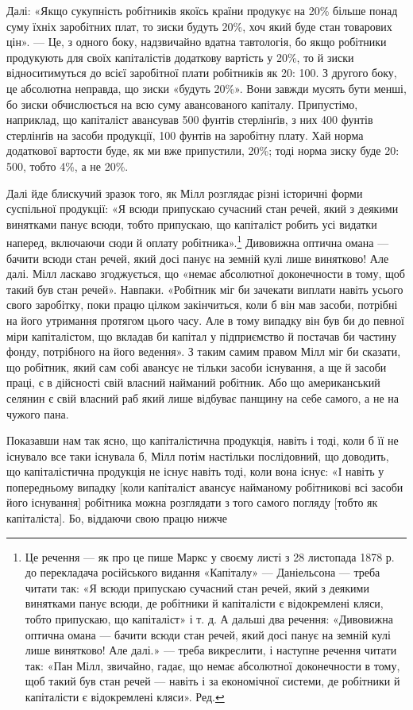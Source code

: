 Далі: «Якщо сукупність робітників якоїсь країни продукує
на 20\% більше понад суму їхніх заробітних плат, то зиски будуть
20\%, хоч який буде стан товарових цін». — Це, з одного
боку, надзвичайно вдатна тавтологія, бо якщо робітники продукують
для своїх капіталістів додаткову вартість у 20\%, то й зиски
відноситимуться до всієї заробітної плати робітників як 20: 100.
З другого боку, це абсолютна неправда, що зиски «будуть 20\%».
Вони завжди мусять бути менші, бо зиски обчислюється на всю
суму авансованого капіталу. Припустімо, наприклад, що капіталіст
авансував 500 фунтів стерлінґів, з них 400 фунтів стерлінґів
на засоби продукції, 100 фунтів на заробітну плату. Хай
норма додаткової вартости буде, як ми вже припустили, 20\%;
тоді норма зиску буде 20: 500, тобто 4\%, а не 20\%.

Далі йде блискучий зразок того, як Мілл розглядає різні
історичні форми суспільної продукції: «Я всюди припускаю
сучасний стан речей, який з деякими винятками панує всюди,
тобто припускаю, що капіталіст робить усі видатки наперед,
включаючи сюди й оплату робітника».\footnote*{
Це речення — як про це пише Маркс у своєму листі з 28 листопада
1878 р. до перекладача російського видання «Капіталу» — Даніельсона —
треба читати так: «Я всюди припускаю сучасний стан речей, який з деякими
винятками панує всюди, де робітники й капіталісти є відокремлені
кляси, тобто припускаю, що капіталіст» і т. д. А дальші два речення:
«Дивовижна оптична омана — бачити всюди стан речей, який досі
панує на земній кулі лише винятково! Але далі.» — треба викреслити, і
наступне речення читати так: «Пан Мілл, звичайно, гадає, що немає
абсолютної доконечности в тому, щоб такий був стан речей — навіть
і за економічної системи, де робітники й капіталісти є відокремлені
кляси». Ред.
} Дивовижна оптична
омана — бачити всюди стан речей, який досі панує на земній
кулі лише винятково! Але далі. Мілл ласкаво згоджується, що
«немає абсолютної доконечности в тому, щоб такий був стан
речей». Навпаки. «Робітник міг би зачекати виплати навіть
усього свого заробітку, поки працю цілком закінчиться, коли б
він мав засоби, потрібні на його утримання протягом цього часу.
Але в тому випадку він був би до певної міри капіталістом, що
вкладав би капітал у підприємство й постачав би частину фонду,
потрібного на його ведення». З таким самим правом Мілл міг би
сказати, що робітник, який сам собі авансує не тільки засоби
існування, а ще й засоби праці, є в дійсності свій власний найманий
робітник. Або що американський селянин є свій власний
раб який лише відбуває панщину на себе самого, а не на чужого
пана.

Показавши нам так ясно, що капіталістична продукція, навіть
і тоді, коли б її не існувало все таки існувала б, Мілл потім
настільки послідовний, що доводить, що капіталістична продукція
не існує навіть тоді, коли вона існує: «І навіть у попередньому
випадку [коли капіталіст авансує найманому робітникові всі
засоби його існування] робітника можна розглядати з того самого
погляду [тобто як капіталіста]. Бо, віддаючи свою працю нижче